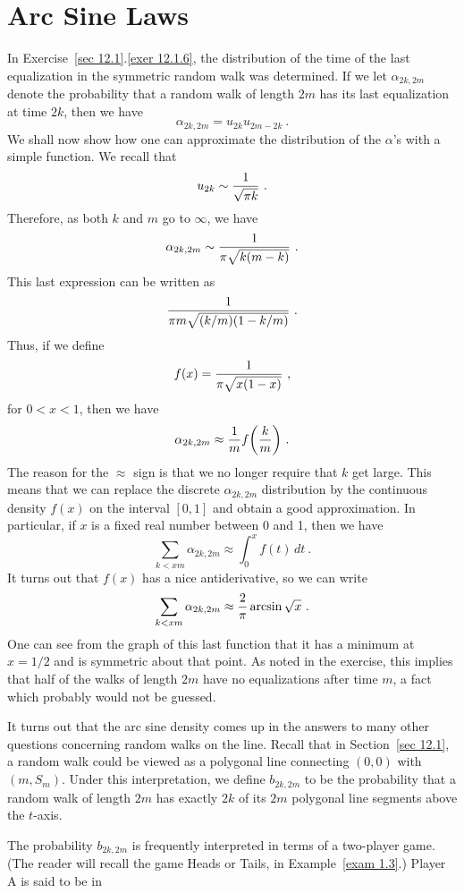  
\section{Arc Sine Laws}\label{sec 12.3}
\par
In Exercise~\ref{sec 12.1}.\ref{exer 12.1.6}, the distribution of the time
of the last equalization in the symmetric random walk was determined.  If we let $\alpha_{2k, 2m}$
denote the probability that a random walk of length $2m$ has its last equalization at time
$2k$, then we have
$$\alpha_{2k, 2m} = u_{2k}u_{2m-2k}\ .$$
We shall now show how one can approximate the distribution of the $\alpha$'s with a simple
function.  We recall that 
$$u_{2k} \sim {1\over{\sqrt {\pi k}}}\ .$$
Therefore, as both $k$ and $m$ go to $\infty$, we have
$$\alpha_{2k, 2m} \sim {1\over{\pi \sqrt{k(m-k)}}}\ .$$
This last expression can be written as
$${1\over{\pi m \sqrt{(k/m)(1 - k/m)}}}\ .$$
Thus, if we define 
$$f(x) = {1\over{\pi \sqrt{x(1-x)}}}\ ,$$
for $0 < x < 1$, then we have
$$\alpha_{2k, 2m} \approx {1\over m}f\biggl({k\over m}\biggr)\ .$$
The reason for the $\approx$ sign is that we no longer require that $k$ get large.  This means
that we can replace the discrete $\alpha_{2k, 2m}$ distribution by the continuous density $f(x)$ on
the interval $[0, 1]$ and obtain a good approximation.  In particular, if $x$ is a fixed real
number between 0 and 1, then we have
$$\sum_{k < xm}\alpha_{2k, 2m} \approx \int_0^x f(t)\,dt\ .$$
It turns out that $f(x)$ has a nice antiderivative, so we can write
$$\sum_{k < xm}\alpha_{2k, 2m} \approx {2\over \pi}\arcsin \sqrt x\ .$$  
One can see from the graph of this last function that it has a minimum at $x = 1/2$ and is
symmetric about that point.  As noted in the exercise, this implies that half of the walks of
length $2m$ have no equalizations after time $m$, a fact which probably would not be guessed.
\par
It turns out that the arc sine density comes up in the answers to many other questions
concerning random walks on the line.  Recall that in Section~\ref{sec 12.1}, a random walk could be
viewed as a polygonal line connecting $(0,0)$ with $(m, S_m)$.  Under this interpretation, we
define $b_{2k, 2m}$ to be the probability that a random walk of length $2m$ has exactly $2k$ of
its $2m$ polygonal line segments above the $t$-axis.  
\par
The probability $b_{2k, 2m}$ is frequently interpreted in terms of a two-player game.  (The
reader will recall the game Heads or Tails, in Example~\ref{exam 1.3}.)  Player A is said to be in

